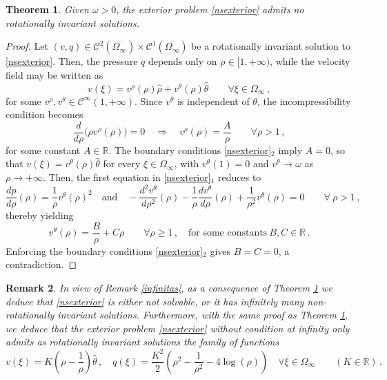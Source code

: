\documentclass[a4paper,11pt]{article}
\newtheorem{theorem}{Theorem}[section]
\newtheorem{remark}[theorem]{Remark}
\numberwithin{equation}{section}
\numberwithin{figure}{section}
\def\neweq#1{\begin{equation}\label{#1}}
\def\endeq{\end{equation}}
\begin{document}
\begin{theorem} \label{nosimetria}
Given $\omega > 0$, the exterior problem \eqref{nsexterior} admits no rotationally invariant solutions.
\end{theorem}
\noindent
\begin{proof} Let $(v, q) \in \mathcal{C}^{2}(\overline{\Omega_{\infty}}) \times \mathcal{C}^{1}(\overline{\Omega_{\infty}})$ be a rotationally
invariant solution to \eqref{nsexterior}. Then, the pressure $q$ depends only on $\rho \in [1,+\infty)$, while the velocity
field may be written as
$$
v(\xi) = v^{\rho}(\rho) \widehat{\rho} + v^{\theta}(\rho) \widehat{\theta} \qquad  \forall \xi \in \Omega_{\infty} \, ,
$$
for some $v^{\rho}, v^{\theta}  \in \mathcal{C}^{\infty}(1,+\infty)$. Since $v^\theta$ is independent
of $\theta$, the incompressibility condition becomes
$$
\dfrac{d}{d\rho}\big(\rho v^{\rho}(\rho)\big)=0\quad \Longrightarrow \quad v^{\rho}(\rho) = \dfrac{A}{\rho} \qquad \forall \rho > 1 \, ,
$$
for some constant $A \in \mathbb{R}$. The boundary conditions \eqref{nsexterior}$_2$ imply $A=0$, so that $v(\xi) = v^{\theta}(\rho)
\widehat{\theta}$ for every
$\xi \in \Omega_{\infty}$, with $v^{\theta}(1) = 0$ and $v^{\theta}\to \omega$ as $\rho \to +\infty$. Then, the first equation in
\eqref{nsexterior}$_1$ reduces to
$$
\frac{d p}{d \rho}(\rho) = \dfrac{1}{\rho} v^{\theta}(\rho)^{2} \quad \text{and} \quad -\dfrac{d^2 v^{\theta}}{d\rho^2}(\rho) - \frac{1}{\rho}
\dfrac{d v^{\theta}}{d\rho}(\rho) + \dfrac{1}{\rho^{2}} v^{\theta}(\rho) = 0 \qquad \forall \ \rho > 1 \, ,
$$
thereby yielding
$$
v^{\theta}(\rho) = \dfrac{B}{\rho} + C \rho \qquad \forall \rho \geq 1 \, , \quad \text{for some constants} \  B,C \in \mathbb{R} \, .
$$
Enforcing the boundary conditions \eqref{nsexterior}$_2$ gives $B=C=0$, a contradiction.
\end{proof}

\begin{remark}\label{NSparadox}
In view of Remark \ref{infinitas}, as a consequence of Theorem \ref{nosimetria} we deduce that \eqref{nsexterior} is either not
solvable, or it has infinitely many non-rotationally invariant solutions. Furthermore, with the same proof
as Theorem \ref{nosimetria}, we deduce that the exterior problem \eqref{nsexterior} {\em without condition at infinity} only admits
as rotationally invariant solutions the family of functions
\neweq{uniqueK}
v(\xi)=K\left(\rho-\frac{1}{\rho}\right)\widehat\theta\, ,\quad q(\xi)= \dfrac{K^2}{2} \left( \rho^2 -\frac{1}{\rho^2} - 4\log(\rho) \right)
\quad\forall\xi\in\Omega_\infty\qquad(K\in\mathbb{R})\, .
\endeq
\end{remark}
\end{document}
